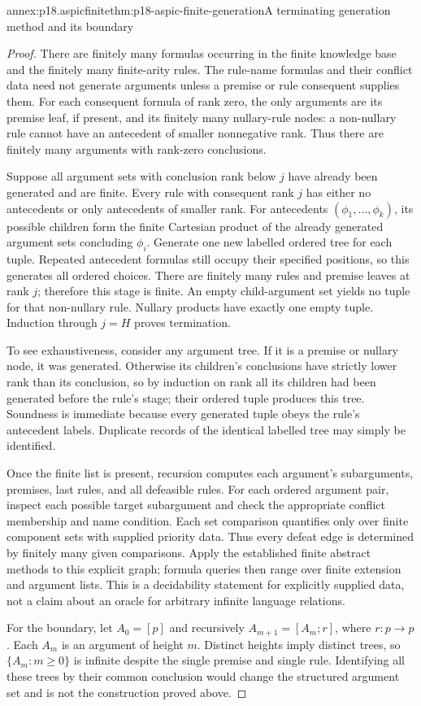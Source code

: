 \begin{annexitem}{annex:p18.aspicfinite}{thm:p18-aspic-finite-generation}{A terminating generation method and its boundary}
\begin{proof}
There are finitely many formulas occurring in the finite knowledge base
and the finitely many finite-arity rules. The rule-name formulas and
their conflict data need not generate arguments unless a premise or
rule consequent supplies them.
For each consequent formula of rank zero, the only arguments are its
premise leaf, if present, and its finitely many nullary-rule nodes:
a non-nullary rule cannot have an antecedent of smaller nonnegative rank.
Thus there are finitely many arguments with rank-zero conclusions.

Suppose all argument sets with conclusion rank below \(j\) have already
been generated and are finite. Every rule with consequent rank \(j\)
has either no antecedents or only antecedents of smaller rank.
For antecedents \((\phi_1,\ldots,\phi_k)\), its possible children form
the finite Cartesian product of the already generated argument sets
concluding \(\phi_i\). Generate one new labelled ordered tree for each
tuple. Repeated antecedent formulas still occupy their specified
positions, so this generates all ordered choices.
There are finitely many rules and premise leaves at rank \(j\);
therefore this stage is finite. An empty child-argument set yields no
tuple for that non-nullary rule. Nullary products have exactly one
empty tuple. Induction through \(j=H\) proves termination.

To see exhaustiveness, consider any argument tree. If it is a premise
or nullary node, it was generated. Otherwise its children's conclusions
have strictly lower rank than its conclusion, so by induction on rank
all its children had been generated before the rule's stage; their
ordered tuple produces this tree. Soundness is immediate because every
generated tuple obeys the rule's antecedent labels. Duplicate records
of the identical labelled tree may simply be identified.

Once the finite list is present, recursion computes each argument's
subarguments, premises, last rules, and all defeasible rules. For each
ordered argument pair, inspect each possible target subargument and
check the appropriate conflict membership and name condition. Each set
comparison quantifies only over finite component sets with supplied
priority data. Thus every defeat edge is determined by finitely many
given comparisons. Apply the established finite abstract methods to this
explicit graph; formula queries then range over finite extension and
argument lists. This is a decidability statement for explicitly supplied
data, not a claim about an oracle for arbitrary infinite language relations.

For the boundary, let \(A_0=[p]\) and recursively
\(A_{m+1}=[A_m;r]\), where \(r:p\to p\).
Each \(A_m\) is an argument of height \(m\). Distinct heights imply
distinct trees, so \(\{A_m:m\geq0\}\) is infinite despite the single
premise and single rule. Identifying all these trees by their common
conclusion would change the structured argument set and is not the
construction proved above.
\end{proof}
\end{annexitem}
